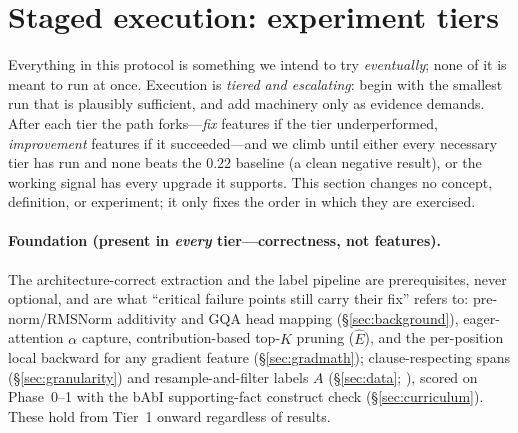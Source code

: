 \documentclass[11pt]{article}
\begin{document}
\section{Staged execution: experiment tiers}
\label{sec:tiers}
Everything in this protocol is something we intend to try \emph{eventually}; none of it is meant to run
at once. Execution is \emph{tiered and escalating}: begin with the smallest run that is plausibly
sufficient, and add machinery only as evidence demands. After each tier the path forks---\emph{fix}
features if the tier underperformed, \emph{improvement} features if it succeeded---and we climb until
either every necessary tier has run and none beats the $0.22$ baseline (a clean negative result), or the
working signal has every upgrade it supports. This section changes no concept, definition, or
experiment; it only fixes the order in which they are exercised.

\paragraph{Foundation (present in \emph{every} tier---correctness, not features).}
The architecture-correct extraction and the label pipeline are prerequisites, never optional, and are
what ``critical failure points still carry their fix'' refers to: pre-norm/RMSNorm additivity and GQA
head mapping (\S\ref{sec:background}), eager-attention $\alpha$ capture, contribution-based top-$K$
pruning ($\widehat E$), and the per-position local backward for any gradient feature
(\S\ref{sec:gradmath}); clause-respecting spans (\S\ref{sec:granularity}) and resample-and-filter
labels $A$ (\S\ref{sec:data}; \cite{bogdan2025thought}), scored on Phase~0--1 with the bAbI supporting-fact construct
check (\S\ref{sec:curriculum}). These hold from Tier~1 onward regardless of results.
\end{document}
